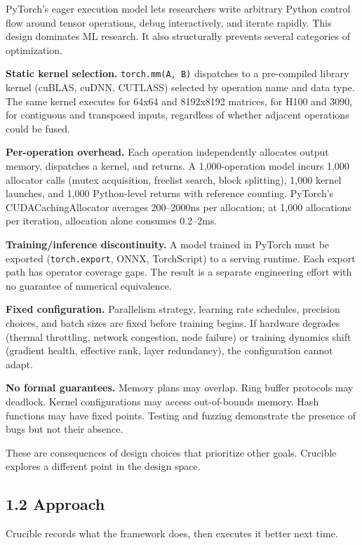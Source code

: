 PyTorch's eager execution model lets researchers write arbitrary Python control flow around tensor operations, debug interactively, and iterate rapidly. This design dominates ML research. It also structurally prevents several categories of optimization.

\textbf{Static kernel selection.} \texttt{torch.mm(A,\ B)} dispatches to a pre-compiled library kernel (cuBLAS, cuDNN, CUTLASS) selected by operation name and data type. The same kernel executes for 64x64 and 8192x8192 matrices, for H100 and 3090, for contiguous and transposed inputs, regardless of whether adjacent operations could be fused.

\textbf{Per-operation overhead.} Each operation independently allocates output memory, dispatches a kernel, and returns. A 1,000-operation model incurs 1,000 allocator calls (mutex acquisition, freelist search, block splitting), 1,000 kernel launches, and 1,000 Python-level returns with reference counting. PyTorch's CUDACachingAllocator averages 200--2000ns per allocation; at 1,000 allocations per iteration, allocation alone consumes 0.2--2ms.

\textbf{Training/inference discontinuity.} A model trained in PyTorch must be exported (\texttt{torch.export}, ONNX, TorchScript) to a serving runtime. Each export path has operator coverage gaps. The result is a separate engineering effort with no guarantee of numerical equivalence.

\textbf{Fixed configuration.} Parallelism strategy, learning rate schedules, precision choices, and batch sizes are fixed before training begins. If hardware degrades (thermal throttling, network congestion, node failure) or training dynamics shift (gradient health, effective rank, layer redundancy), the configuration cannot adapt.

\textbf{No formal guarantees.} Memory plans may overlap. Ring buffer protocols may deadlock. Kernel configurations may access out-of-bounds memory. Hash functions may have fixed points. Testing and fuzzing demonstrate the presence of bugs but not their absence.

These are consequences of design choices that prioritize other goals. Crucible explores a different point in the design space.

\subsection{1.2 Approach}\label{approach}

Crucible records what the framework does, then executes it better next time.

